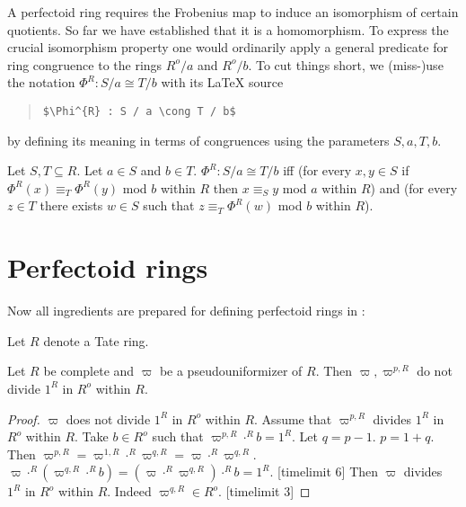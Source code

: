 \documentclass[11pt]{article}
\begin{document}
A perfectoid ring requires the Frobenius map to induce an isomorphism
of certain quotients.
So far we have established that it is a homomorphism.
To express the crucial isomorphism  property one would ordinarily 
apply a general predicate for ring congruence to the rings
$R^o/a$ and $R^o/b$. To cut things short, we (miss-)use the notation
$\Phi^{R} : S / a \cong T / b$ with 
its \LaTeX{} source 
\begin{quotation}
\verb|$\Phi^{R} : S / a \cong T / b$|
\end{quotation}
by defining its meaning in terms of congruences using the 
parameters $S,a,T,b$.
\begin{forthel}

\begin{definition} Let $S,T \subseteq R$. Let $a \in S$ and $b \in T$. 
$\Phi^{R} : S / a \cong T / b$
iff
(for every $x,y \in S$ if 
$\Phi^{R}(x) \equiv_{T} \Phi^{R}(y)$ mod $b$ within $R$ 
then $x \equiv_{S} y$ mod $a$ within $R$)
and
(for every $z \in T$ there exists $w \in S$ such that 
$z \equiv_{T} \Phi^{R}(w)$ mod $b$ within $R$).
\end{definition}

\end{forthel}

\section{Perfectoid rings}

Now all ingredients are prepared for defining
perfectoid rings in \Naproche{}:

\begin{forthel}


Let $R$ denote a Tate ring.

\begin{lemma}
Let $R$ be complete and $\varpi$ be a pseudouniformizer of $R$.
Then $\varpi, \varpi^{p,R}$ do not divide $1^{R}$ in $R^o$ within $R$.
\end{lemma}
\begin{proof}
$\varpi$ does not divide $1^{R}$ in $R^o$ within $R$.
Assume that $\varpi^{p,R}$ divides $1^{R}$ in $R^o$ within $R$.
Take $b \in R^o$ such that $\varpi^{p,R} \cdot^{R} b = 1^{R}$.
Let $q = p -1$. $p = 1 + q$. Then  $\varpi^{p,R} = 
\varpi^{1,R} \cdot^{R} \varpi^{q,R} = \varpi \cdot^{R} \varpi^{q,R}$.
$ \varpi \cdot^{R} (\varpi^{q,R} \cdot^{R} b) =
(\varpi \cdot^{R} \varpi^{q,R}) \cdot^{R} b =
1^{R}$.
[timelimit 6] 
Then $\varpi$ divides $1^{R}$ in $R^o$ within $R$. Indeed 
$\varpi^{q,R} \in R^o$.
[timelimit 3]
\end{proof}
\end{forthel}
\end{document}
